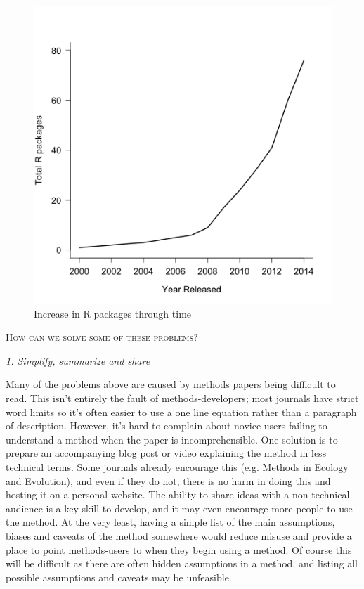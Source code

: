 \documentclass[a4paper,12pt]{article}
\renewcommand{\section}[1]{
  \bigskip
  \begin{center}
  \begin{Large}
  \normalfont\scshape #1
  \medskip
  \end{Large}
  \end{center}
}
\renewcommand{\subsection}[1]{
  \bigskip
  \begin{center}
  \begin{large}
  \normalfont\itshape #1
  \end{large}
  \end{center}
}
\begin{document}
\begin{figure}[h]
\centering
\includegraphics[width=12cm]{Figures/PackagesThruTime.png}
\caption{Increase in R packages through time}
\label{PCMRpackages}
\end{figure}

\section{How can we solve some of these problems?}

\subsection{1. Simplify, summarize and share}
Many of the problems above are caused by methods papers being difficult to read. 
This isn't entirely the fault of methods-developers; most journals have strict word limits so it's often easier to use a one line equation rather than a paragraph of description. 
However, it's hard to complain about novice users failing to understand a method when the paper is incomprehensible. %
One solution is to prepare an accompanying blog post or video explaining the method in less technical terms. 
Some journals already encourage this (e.g. Methods in Ecology and Evolution), and even if they do not, there is no harm in doing this and hosting it on a personal website. 
The ability to share ideas with a non-technical audience is a key skill to develop, and it may even encourage more people to use the method. 
At the very least, having a simple list of the main assumptions, biases and caveats of the method somewhere would reduce misuse and provide a place to point methods-users to when they begin using a method.
Of course this will be difficult as there are often hidden assumptions in a method, and listing all possible assumptions and caveats may be unfeasible.\\
\end{document}
